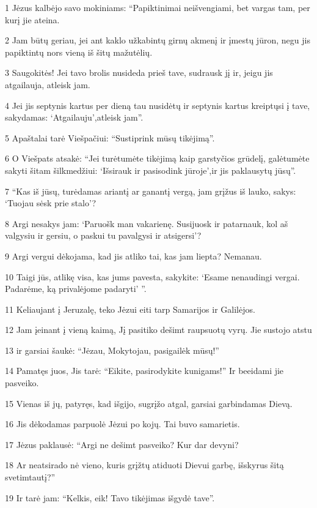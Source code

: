 \par 1 Jėzus kalbėjo savo mokiniams: “Papiktinimai neišvengiami, bet vargas tam, per kurį jie ateina. 
\par 2 Jam būtų geriau, jei ant kaklo užkabintų girnų akmenį ir įmestų jūron, negu jis papiktintų nors vieną iš šitų mažutėlių. 
\par 3 Saugokitės! Jei tavo brolis nusideda prieš tave, sudrausk jį ir, jeigu jis atgailauja, atleisk jam. 
\par 4 Jei jis septynis kartus per dieną tau nusidėtų ir septynis kartus kreiptųsi į tave, sakydamas: ‘Atgailauju’,­atleisk jam”. 
\par 5 Apaštalai tarė Viešpačiui: “Sustiprink mūsų tikėjimą”. 
\par 6 O Viešpats atsakė: “Jei turėtumėte tikėjimą kaip garstyčios grūdelį, galėtumėte sakyti šitam šilkmedžiui: ‘Išsirauk ir pasisodink jūroje’,­ir jis paklausytų jūsų”. 
\par 7 “Kas iš jūsų, turėdamas ariantį ar ganantį vergą, jam grįžus iš lauko, sakys: ‘Tuojau sėsk prie stalo’? 
\par 8 Argi nesakys jam: ‘Paruošk man vakarienę. Susijuosk ir patarnauk, kol aš valgysiu ir gersiu, o paskui tu pavalgysi ir atsigersi’? 
\par 9 Argi vergui dėkojama, kad jis atliko tai, kas jam liepta? Nemanau. 
\par 10 Taigi jūs, atlikę visa, kas jums pavesta, sakykite: ‘Esame nenaudingi vergai. Padarėme, ką privalėjome padaryti’ ”. 
\par 11 Keliaujant į Jeruzalę, teko Jėzui eiti tarp Samarijos ir Galilėjos. 
\par 12 Jam įeinant į vieną kaimą, Jį pasitiko dešimt raupsuotų vyrų. Jie sustojo atstu 
\par 13 ir garsiai šaukė: “Jėzau, Mokytojau, pasigailėk mūsų!” 
\par 14 Pamatęs juos, Jis tarė: “Eikite, pasirodykite kunigams!” Ir beeidami jie pasveiko. 
\par 15 Vienas iš jų, patyręs, kad išgijo, sugrįžo atgal, garsiai garbindamas Dievą. 
\par 16 Jis dėkodamas parpuolė Jėzui po kojų. Tai buvo samarietis. 
\par 17 Jėzus paklausė: “Argi ne dešimt pasveiko? Kur dar devyni? 
\par 18 Ar neatsirado nė vieno, kuris grįžtų atiduoti Dievui garbę, išskyrus šitą svetimtautį?” 
\par 19 Ir tarė jam: “Kelkis, eik! Tavo tikėjimas išgydė tave”. 
